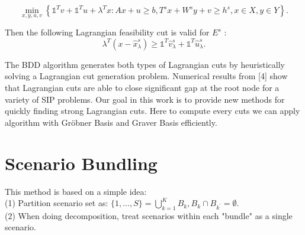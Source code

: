 \documentclass{article}
\theoremstyle{plain}
\theoremstyle{definition}
\begin{document}
$$\min _{x, y, u, v}\left\{\mathbb{1}^{T} v+\mathbb{1}^{T} u+\lambda^{T} x: A x+u \geq b, T^{s} x+W^{s} y+v \geq h^{s}, x \in X, y \in Y\right\} .$$

Then the following Lagrangian feasibility cut is valid for  $E^{s}$ :
$$\lambda^{T}\left(x-\hat{x}_{\lambda}^{s}\right) \geq \mathbb{1}^{T} \hat{v}_{\lambda}^{s}+\mathbb{1}^{T} \hat{u}_{\lambda}^{s} .$$

The BDD algorithm generates both types of Lagrangian cuts by heuristically solving a Lagrangian cut generation problem. Numerical results from [4] show that Lagrangian cuts are able to close significant gap at the root node for a variety of SIP problems. Our goal in this work is to provide new methods for quickly finding strong Lagrangian cuts. Here to compute every cuts we can apply algorithm with Gröbner Basis and Graver Basis efficiently.

\section{Scenario Bundling}

This method is based on a simple idea: \\
\indent (1) Partition scenario set as:  $\{1, \ldots, S\}=\bigcup_{k=1}^{K} B_{k}, B_{k} \cap B_{k^{\prime}}=\emptyset $. \\
\indent (2) When doing decomposition, treat scenarios within each "bundle" as a single scenario. \\
\end{document}
